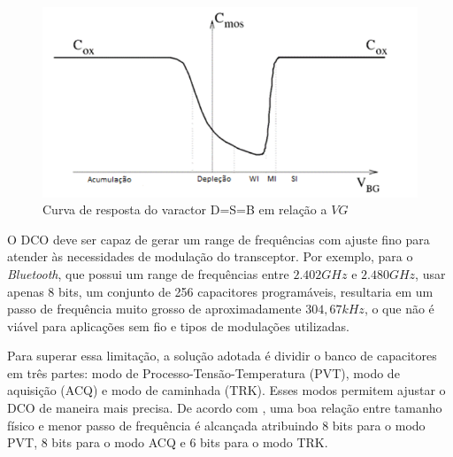 \begin{figure}[h!]
	\caption{Curva de resposta do varactor D=S=B em relação a $VG$ }
	\begin{center}
		\includegraphics[scale=0.6]{img/curva_COX_vbg.png}
	\end{center}
	\label{fig:curva_COX_vbg}
\end{figure}

O DCO deve ser capaz de gerar um range de frequências com ajuste fino para atender às necessidades de modulação do transceptor. Por exemplo, para o \textit{Bluetooth}, que possui um range de frequências entre $2.402GHz$ e $2.480GHz$, usar apenas 8 bits, um conjunto de 256 capacitores programáveis, resultaria em um passo de frequência muito grosso de aproximadamente $304,67kHz$, o que não é viável para aplicações sem fio e tipos de modulações utilizadas.

Para superar essa limitação, a solução adotada é dividir o banco de capacitores em três partes: modo de Processo-Tensão-Temperatura (PVT), modo de aquisição (ACQ) e modo de caminhada (TRK). Esses modos permitem ajustar o DCO de maneira mais precisa. De acordo com \cite{staszewski2006all}, uma boa relação entre tamanho físico e menor passo de frequência é alcançada atribuindo 8 bits para o modo PVT, 8 bits para o modo ACQ e 6 bits para o modo TRK.

